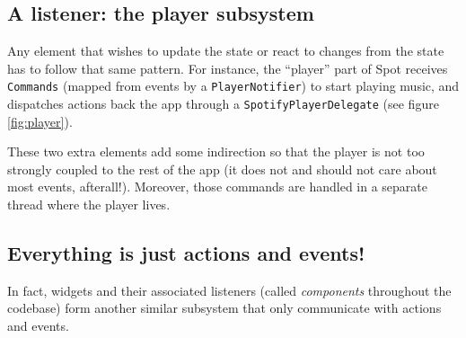 \documentclass[12pt, a4paper]{article}
\begin{document}
\subsection{A listener: the player subsystem}

Any element that wishes to update the state or react to changes from the state has to follow that same pattern. For instance, the ``player'' part of Spot receives \texttt{Commands} (mapped from events by a \texttt{PlayerNotifier}) to start playing music, and dispatches actions back the app through a \texttt{SpotifyPlayerDelegate} (see figure \ref{fig:player}). 

These two extra elements add some indirection so that the player is not too strongly coupled to the rest of the app (it does not and should not care about most events, afterall!). Moreover, those commands are handled in a separate thread where the player lives.

\subsection{Everything is just actions and events!}

In fact, widgets and their associated listeners (called \emph{components} throughout the codebase) form another similar subsystem that only communicate with actions and events.
\end{document}
